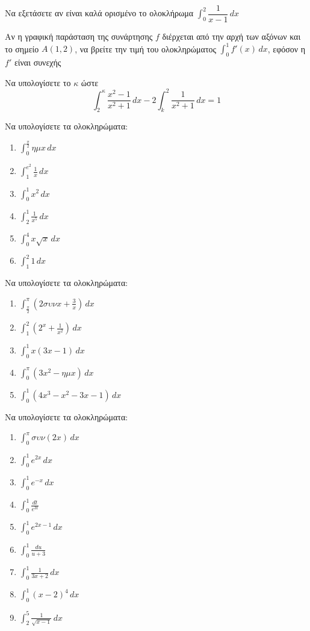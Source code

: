 \documentclass{presentation}
\begin{document}
\begin{askisi}
  Να εξετάσετε αν είναι καλά ορισμένο το ολοκλήρωμα $\int_{0}^{2}\dfrac{1}{x-1}\, dx$
\end{askisi}

\begin{askisi}
  Αν η γραφική παράσταση της συνάρτησης $f$ διέρχεται από την αρχή των αξόνων και το σημείο $Α(1,2)$, να βρείτε την τιμή του ολοκληρώματος $\int_{0}^{1}f'(x)\,dx$, εφόσον η $f'$ είναι συνεχής
\end{askisi}

\begin{askisi}
  Να υπολογίσετε το $κ$ ώστε
  $$\int_{2}^{κ}\frac{x^2-1}{x^2+1}\, dx-2\int_{k}^{2}\frac{1}{x^2+1}\, dx=1$$
\end{askisi}

\begin{askisi}
  Να υπολογίσετε τα ολοκληρώματα:
  \begin{enumerate}[<+->]
    \item $\int_{0}^{\frac{π}{2}}ημx\,dx$
    \item $\int_{1}^{e^2}\frac{1}{x}\,dx$
    \item $\int_{0}^{1}x^2\,dx$
    \item $\int_{2}^{1}\frac{1}{x^5}\,dx$
    \item $\int_{0}^{4}x\sqrt{x}\,dx$
    \item $\int_{1}^{2}1\,dx$
  \end{enumerate}
\end{askisi}

\begin{askisi}
  Να υπολογίσετε τα ολοκληρώματα:
  \begin{enumerate}[<+->]
    \item $\int_{\frac{π}{2}}^{π}\left( 2συνx+\frac{3}{x} \right)\,dx$
    \item $\int_{1}^{2}\left( 2^x+\frac{1}{x^2} \right)\,dx$
    \item $\int_{0}^{1}x(3x-1)\,dx$
    \item $\int_{0}^{π}(3x^2-ημx)\,dx$
    \item $\int_{0}^{1}(4x^3-x^2-3x-1)\,dx$
  \end{enumerate}
\end{askisi}

\begin{askisi}
  Να υπολογίσετε τα ολοκληρώματα:
  \begin{enumerate}[<+->]
    \item $\int_{0}^{π}συν(2x)\,dx$
    \item $\int_{0}^{1}e^{2x}\,dx$
    \item $\int_{0}^{1}e^{-x}\,dx$
    \item $\int_{0}^{1}\frac{dt}{e^{3t}}$
    \item $\int_{0}^{1}e^{2x-1}\,dx$
    \item $\int_{0}^{1}\frac{du}{u+3}$
    \item $\int_{0}^{1}\frac{1}{3x+2}\,dx$
    \item $\int_{0}^{1}(x-2)^4\,dx$
    \item $\int_{2}^{5}\frac{1}{\sqrt{x-1}}\,dx$
  \end{enumerate}
\end{askisi}
\end{document}
